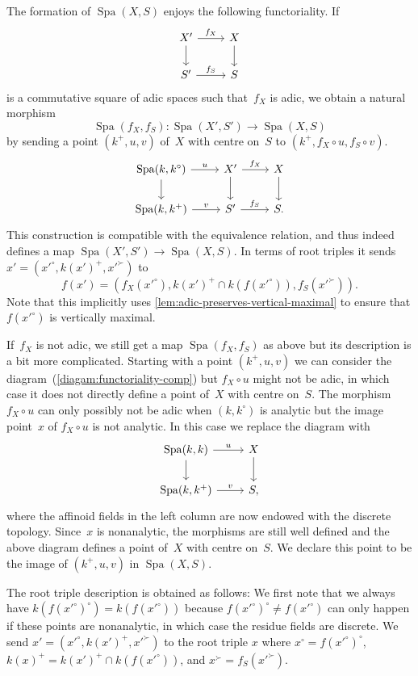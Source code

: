 \documentclass[a4paper,twoside,11pt,reqno]{amsart}
\DeclareMathOperator{\Spa}{Spa}
\theoremstyle{definition}
\numberwithin{equation}{subsection}
\begin{document}
The formation of $\Spa(X,S)$ enjoys the following functoriality.
If
    \[ 
        \begin{tikzcd}
            X'\ar[d] \ar[r,"f_X"] & X\ar[d] \\
            S'\ar[r,"f_S"] & S
        \end{tikzcd}
    \]
is a commutative square of adic spaces such that~$f_X$ is adic, we obtain a natural morphism
\[
 \Spa(f_X,f_S) \colon \Spa(X',S') \longrightarrow \Spa(X,S)
\]
by sending a point $(k^+,u,v)$ of~$X$ with centre on~$S$ to $(k^+,f_X \circ u,f_S \circ v)$.
\begin{equation} \label{diagam:functoriality-comp}
 \begin{tikzcd}
     \Spa(k,k^\circ)    \ar[r,"u"]  \ar[d]  & X'    \ar[r,"f_X"]    \ar[d]  & X \ar[d]  \\
     \Spa(k,k^+)        \ar[r,"v"]          & S'    \ar[r,"f_S"]            & S.
 \end{tikzcd}
\end{equation}
This construction is compatible with the equivalence relation, and thus indeed defines a map $\Spa(X',S') \to \Spa(X,S)$.
In terms of root triples it sends $x' = (x'^\circ,k(x')^+,x'^\succ)$ to
\[
    f(x') = (f_X(x'^\circ),k(x')^+ \cap k(f(x'^\circ)),f_S(x'^\succ)).
\]
Note that this implicitly uses \cref{lem:adic-preserves-vertical-maximal} to ensure that $f(x'^\circ)$ is vertically maximal.

If~$f_X$ is not adic, we still get a map $\Spa(f_X,f_S)$ as above but its description is a bit more complicated.
Starting with a point $(k^+,u,v)$ we can consider the diagram~(\ref{diagam:functoriality-comp}) but $f_X \circ u$ might not be adic, in which case it does not directly define a point of~$X$ with centre on~$S$.
The morphism $f_X \circ u$ can only possibly not be adic when $(k,k^\circ)$ is analytic but the image point~$x$ of $f_X \circ u$ is not analytic.
In this case we replace the diagram with
\[
    \begin{tikzcd}
        \Spa(k,k)   \ar[r,"u"]  \ar[d]  & X \ar[d]  \\
        \Spa(k,k^+) \ar[r,"v"]          & S,
    \end{tikzcd}
\]
where the affinoid fields in the left column are now endowed with the discrete topology.
Since~$x$ is nonanalytic, the morphisms are still well defined and the above diagram defines a point of~$X$ with centre on~$S$.
We declare this point to be the image of $(k^+,u,v)$ in $\Spa(X,S)$.

The root triple description is obtained as follows:
We first note that we always have $k(f(x'^\circ)^\circ) = k(f(x'^\circ))$ because $f(x'^\circ)^\circ \ne f(x'^\circ)$ can only happen if these points are nonanalytic, in which case the residue fields are discrete.
We send $x' = (x'^\circ,k(x')^+,x'^\succ)$ to the root triple $x$ where $x^\circ = f(x'^\circ)^\circ$, $k(x)^+ = k(x')^+ \cap k(f(x'^\circ))$, and $x^\succ = f_S(x'^\succ)$.
\end{document}
